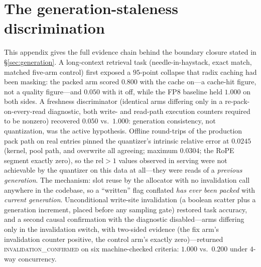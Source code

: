\documentclass[11pt]{article}
\begin{document}
\section{The generation-staleness discrimination}
\label{app:staleness}
This appendix gives the full evidence chain behind the boundary closure
stated in \S\ref{sec:generation}. A long-context retrieval task
(needle-in-haystack, exact match, matched five-arm control) first exposed a
$95$-point collapse that radix caching had been masking: the packed arm scored
$0.800$ with the cache on---a cache-hit figure, not a quality figure---and
$0.050$ with it off, while the FP8 baseline held $1.000$ on both sides. A
freshness discriminator (identical arms differing only in a
re-pack-on-every-read diagnostic, both write- and read-path execution
counters required to be nonzero) recovered $0.050$ vs.\ $1.000$: generation
consistency, not quantization, was the active hypothesis. Offline round-trips
of the production pack path on real entries pinned the quantizer's intrinsic
relative error at $0.0245$ (kernel, pool path, and overwrite all agreeing;
maximum $0.0304$; the RoPE segment exactly zero), so the $\mathrm{rel}>1$
values observed in serving were not achievable by the quantizer on this data
at all---they were reads of a \emph{previous generation}. The mechanism: slot
reuse by the allocator with no invalidation call anywhere in the codebase, so
a ``written'' flag conflated \emph{has ever been packed} with \emph{current
generation}. Unconditional write-site invalidation (a boolean scatter plus a
generation increment, placed before any sampling gate) restored task accuracy,
and a second causal confirmation with the diagnostic disabled---arms differing
only in the invalidation switch, with two-sided evidence (the fix arm's
invalidation counter positive, the control arm's exactly zero)---returned
\textsc{invalidation\_confirmed} on six machine-checked criteria: $1.000$
vs.\ $0.200$ under $4$-way concurrency.
\end{document}
